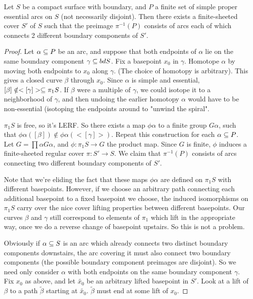\begin{lemma}

Let $S$ be a compact surface with boundary, and $P$ a finite set of simple
proper essential arcs on $S$ (not necessarily disjoint).  Then there exists
a finite-sheeted cover $S'$ of $S$ such that the preimage $\pi^{-1}(P)$
consists of arcs each of which connects 2 different boundary components of
$S'$.

\end{lemma}

\begin{proof}

Let $\alpha \subseteq P$ be an arc, and suppose that both endpoints of $\alpha$ lie
on the same boundary component $\gamma \subseteq bd S$. Fix a basepoint $x_0$ in
$\gamma$.  Homotope $\alpha$ by moving both endpoints to $x_0$ along $\gamma$.
(The choice of homotopy is arbitrary). This gives a closed curve $\beta$
through $x_0$. Since $\alpha$ is simple and essential, $[\beta] \notin
<[\gamma]> \subseteq \pi_1S$. If $\beta$ were a multiple of $\gamma$, we could
isotope it to a neighborhood of $\gamma$, and then undoing the earlier homotopy
$\alpha$ would have to be non-essential (isotoping the endpoints around to
"unwind the spiral".

$\pi_1S$ is free, so it's LERF. So there exists a map $\phi\alpha$ to a finite
group $G\alpha$, such that $\phi\alpha([\beta]) \notin \phi\alpha(<[\gamma]>)$.
Repeat this construction for each $\alpha \subseteq P$. Let $G = \prod \alpha
G\alpha$, and $\phi \colon\pi_1S \to G$ the product map. Since $G$ is finite,
$\phi$ induces a finite-sheeted regular cover $\pi \colon S' \to S$. We claim
that $\pi^{-1}(P)$ consists of arcs connecting two different boundary
components of $S'$.

Note that we're eliding the fact that these maps $\phi\alpha$ are defined on
$\pi_1S$ with different basepoints. However, if we choose an arbitrary path
connecting each additional basepoint to a fixed basepoint we choose, the
induced isomorphisms on $\pi_1S$ carry over the nice cover lifting properties
between different basepoints. Our curves $\beta$ and $\gamma$ still correspond
to elements of $\pi_1$ which lift in the appropriate way, once we do a reverse
change of basepoint upstairs. So this is not a problem.

Obviously if $\alpha \subseteq S$ is an arc which already connects two distinct
boundary components downstairs, the arc covering it must also connect two
boundary components (the possible boundary component preimages are disjoint).
So we need only consider $\alpha$ with both endpoints on the same boundary
component $\gamma$.  Fix $x_0$ as above, and let $\widetilde{x_0}$ be an
arbitrary lifted basepoint in $S'$.  Look at a lift of $\beta$ to a path
$\widetilde{\beta}$ starting at $\widetilde{x_0}$. $\widetilde{\beta}$ must end at some lift
of $x_0$.


\end{proof}
